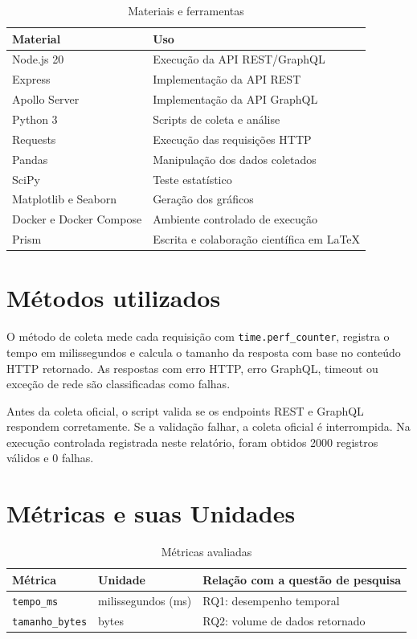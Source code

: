 \documentclass[12pt,a4paper]{article}
\begin{document}
\begin{table}[H]
\centering
\caption{Materiais e ferramentas}
\begin{tabular}{ll}
\toprule
Material & Uso \\
\midrule
Node.js 20 & Execução da API REST/GraphQL \\
Express & Implementação da API REST \\
Apollo Server & Implementação da API GraphQL \\
Python 3 & Scripts de coleta e análise \\
Requests & Execução das requisições HTTP \\
Pandas & Manipulação dos dados coletados \\
SciPy & Teste estatístico \\
Matplotlib e Seaborn & Geração dos gráficos \\
Docker e Docker Compose & Ambiente controlado de execução \\
Prism & Escrita e colaboração científica em LaTeX \cite{openai2026prism} \\
\bottomrule
\end{tabular}
\end{table}

\section{Métodos utilizados}

O método de coleta mede cada requisição com \texttt{time.perf\_counter}, registra o tempo em milissegundos e calcula o tamanho da resposta com base no conteúdo HTTP retornado. As respostas com erro HTTP, erro GraphQL, timeout ou exceção de rede são classificadas como falhas.

Antes da coleta oficial, o script valida se os endpoints REST e GraphQL respondem corretamente. Se a validação falhar, a coleta oficial é interrompida. Na execução controlada registrada neste relatório, foram obtidos 2000 registros válidos e 0 falhas.

\section{Métricas e suas Unidades}

\begin{table}[H]
\centering
\caption{Métricas avaliadas}
\begin{tabular}{lll}
\toprule
Métrica & Unidade & Relação com a questão de pesquisa \\
\midrule
\texttt{tempo\_ms} & milissegundos (ms) & RQ1: desempenho temporal \\
\texttt{tamanho\_bytes} & bytes & RQ2: volume de dados retornado \\
\bottomrule
\end{tabular}
\end{table}
\end{document}

